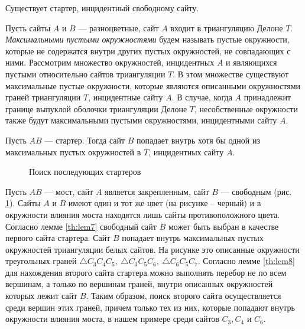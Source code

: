\documentclass[12pt]{article}
\begin{document}
\begin{lemma}
\label{th:lem7}
Существует стартер, инцидентный свободному сайту.
\end{lemma}

Пусть сайты $A$ и $B$ --- разноцветные, сайт $A$ входит в триангуляцию Делоне $T$.
{\itshape Максимальными пустыми окружностями} будем называть пустые окружности,
которые не содержатся внутри других пустых окружностей, не совпадающих с ними.
Рассмотрим множество окружностей, инцидентных $A$ и являющихся пустыми относительно сайтов триангуляции $T$.
В этом множестве существуют максимальные пустые окружности, которые являются описанными окружностями граней триангуляции $T$,
инцидентные сайту $A$. 
В случае, когда $A$ принадлежит границе выпуклой оболочки триангуляции Делоне $T$,
несобственные окружности также будут максимальными пустыми окружностями, инцидентными сайту $A$.

\begin{lemma}
\label{th:lem8}
Пусть $AB$ --- стартер. Тогда сайт $B$ попадает внутрь хотя бы одной из максимальных пустых окружностей в $T$, инцидентных сайту $A$.
\end{lemma}

\begin{figure}[htb!]
	\caption{Поиск последующих стартеров}
	\label{pic:nextStarter}
\end{figure}

Пусть $AB$ --- мост, сайт $A$ является закрепленным, сайт $B$ --- свободным (рис. \ref{pic:nextStarter}).
Сайты $A$ и $B$ имеют один и тот же цвет (на рисунке – черный) и в окружности влияния моста находятся лишь сайты противоположного цвета.
Согласно лемме \ref{th:lem7} свободный сайт $B$ может быть выбран в качестве первого сайта стартера.
Сайт $B$ попадает внутрь максимальных пустых окружностей триангуляции белых сайтов.
На рисунке это описанные окружности треугольных граней $\triangle C_3C_4C_5,~\triangle C_3C_5C_6,~\triangle C_6C_5C_7$.
Согласно лемме \ref{th:lem8} для нахождения второго сайта стартера можно выполнять перебор не по всем вершинам,
а только по вершинам граней, внутри описанных окружностей которых лежит сайт $B$.
Таким образом, поиск второго сайта осуществляется среди вершин этих граней,
причем только тех из них, которые попадают внутрь окружности влияния моста,
в нашем примере среди сайтов $C_3, C_4$ и $C_6$.
\end{document}
